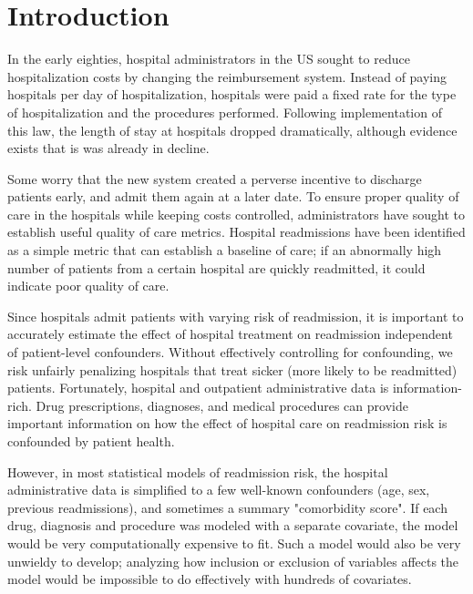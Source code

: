 \documentclass[]{article}\usepackage[]{graphicx}\usepackage[]{color}
\begin{document}
\section{Introduction}
In the early eighties, hospital administrators in the US sought to reduce hospitalization costs by changing the reimbursement system. Instead of paying hospitals per day of hospitalization, hospitals were paid a fixed rate for the type of hospitalization and the procedures performed. Following implementation of this law, the length of stay at hospitals dropped dramatically, although evidence exists that is was already in decline.

Some worry that the new system created a perverse incentive to discharge patients early, and admit them again at a later date. To ensure proper quality of care in the hospitals while keeping costs controlled, administrators have sought to establish useful quality of care metrics. Hospital readmissions have been identified as a simple metric that can establish a baseline of care; if an abnormally high number of patients from a certain hospital are quickly readmitted, it could indicate poor quality of care.

Since hospitals admit patients with varying risk of readmission, it is important to accurately estimate the effect of hospital treatment on readmission independent of patient-level confounders. Without effectively controlling for confounding, we risk unfairly penalizing hospitals that treat sicker (more likely to be readmitted) patients. Fortunately, hospital and outpatient administrative data is information-rich. Drug prescriptions, diagnoses, and medical procedures can provide important information on how the effect of hospital care on readmission risk is confounded by patient health.

However, in most statistical models of readmission risk, the hospital administrative data is simplified to a few well-known confounders (age, sex, previous readmissions), and sometimes a summary "comorbidity score". If each drug, diagnosis and procedure was modeled with a separate covariate, the model would be very computationally expensive to fit. Such a model would also be very unwieldy to develop; analyzing how inclusion or exclusion of variables affects the model would be impossible to do effectively with hundreds of covariates.
\end{document}
